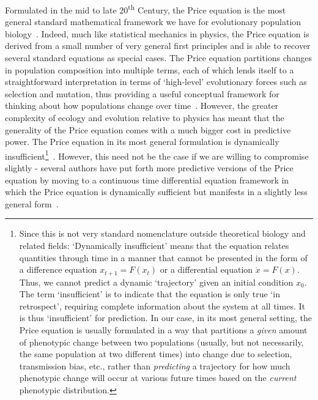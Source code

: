 Formulated in the mid to late 20\textsuperscript{th} Century, the Price equation is the most general standard mathematical framework we have for evolutionary population biology~\citep{frank_natural_2012,frank_universal_2017,queller_fundamental_2017,luque_one_2017,lion_theoretical_2018,lehtonen_price_2018,lehtonen_price_2020,luque_mirror_2021}. Indeed, much like statistical mechanics in physics, the Price equation is derived from a small number of very general first principles and is able to recover several standard equations as special cases. The Price equation partitions changes in population composition into multiple terms, each of which lends itself to a straightforward interpretation in terms of `high-level' evolutionary forces such as selection and mutation, thus providing a useful conceptual framework for thinking about how populations change over time~\citep{frank_natural_2012}. However, the greater complexity of ecology and evolution relative to physics has meant that the generality of the Price equation comes with a much bigger cost in predictive power. The Price equation in its most general formulation is dynamically insufficient\footnote{Since this is not very standard nomenclature outside theoretical biology and related fields: `Dynamically insufficient' means that the equation relates quantities through time in a manner that cannot be presented in the form of a difference equation $x_{t+1} = F(x_t)$ or a differential equation $\dot{x} = F(x)$. Thus, we cannot predict a dynamic `trajectory' given an initial condition $x_0$. The term `insufficient' is to indicate that the equation is only true `in retrospect', requiring complete information about the system at all times. It is thus `insufficient' for prediction. In our case, in its most general setting, the Price equation is usually formulated in a way that partitions a \emph{given} amount of phenotypic change between two populations (usually, but not necessarily, the same population at two different times) into change due to selection, transmission bias, etc., rather than \emph{predicting} a trajectory for how much phenotypic change will occur at various future times based on the \emph{current} phenotypic distribution.}~\citep{van_veelen_use_2005,frank_natural_2012,simon_continuous-time_2014,queller_fundamental_2017}. However, this need not be the case if we are willing to compromise slightly - several authors have put forth more predictive versions of the Price equation by moving to a continuous time differential equation framework in which the Price equation is dynamically sufficient but manifests in a slightly less general form~\citep{page_unifying_2002,lion_theoretical_2018,day_price_2020}.

